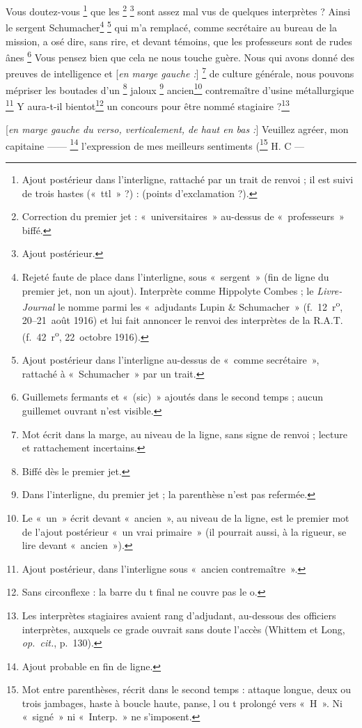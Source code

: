 \begin{LJlettre}
Vous doutez-vous \footnote{Ajout postérieur dans l'interligne, rattaché par un trait de renvoi ; il est suivi de trois hastes («~ttl~» ?) : \LJill{} (points d'exclamation ?).} que les  \footnote{Correction du premier jet : «~universitaires~» au-dessus de «~professeurs~» biffé.} \footnote{Ajout postérieur.} sont assez mal vus de quelques interprètes ? Ainsi le sergent Schumacher\footnote{Rejeté faute de place dans l'interligne, sous «~sergent~» (fin de ligne du premier jet, non un ajout). Interprète comme Hippolyte Combes ; le \textit{Livre-Journal} le nomme parmi les «~adjudants Lupin \& Schumacher~» (f.~12~r\textsuperscript{o}, 20--21~août 1916) et lui fait annoncer le renvoi des interprètes de la R.A.T. (f.~42~r\textsuperscript{o}, 22~octobre 1916).} \footnote{Ajout postérieur dans l'interligne au-dessus de «~comme secrétaire~», rattaché à «~Schumacher~» par un trait.} qui m'a remplacé, comme secrétaire au bureau de la mission, a osé dire, sans rire, et devant témoins, que les professeurs sont de rudes ânes \footnote{Guillemets fermants et «~(sic)~» ajoutés dans le second temps ; aucun guillemet ouvrant n'est visible.} Vous pensez bien que cela ne nous touche guère. Nous qui avons donné des preuves de  intelligence et [\textit{en marge gauche :}] \footnote{Mot écrit dans la marge, au niveau de la ligne, sans signe de renvoi ; lecture et rattachement incertains.} de  culture générale, nous pouvons mépriser les boutades d'un \footnote{Biffé dès le premier jet.} jaloux \footnote{Dans l'interligne, du premier jet ; la parenthèse n'est pas refermée.} ancien\footnote{Le «~un~» écrit devant «~ancien~», au niveau de la ligne, est le premier mot de l'ajout postérieur «~un vrai primaire~» (il pourrait aussi, à la rigueur, se lire devant «~ancien~»).} contremaître d'usine métallurgique \footnote{Ajout postérieur, dans l'interligne sous «~ancien contremaître~».} Y aura-t-il bientot\footnote{Sans circonflexe : la barre du t final ne couvre pas le o.} un concours pour être nommé stagiaire ?\footnote{Les interprètes stagiaires avaient rang d'adjudant, au-dessous des officiers interprètes, auxquels ce grade ouvrait sans doute l'accès (Whittem et Long, \textit{op.~cit.}, p.~130).}

[\textit{en marge gauche du verso, verticalement, de haut en bas :}] Veuillez agréer, mon capitaine —— \footnote{Ajout probable en fin de ligne.} l'expression de mes meilleurs sentiments (\LJill{}\footnote{Mot entre parenthèses, récrit dans le second temps : attaque longue, deux ou trois jambages, haste à boucle haute, panse, l ou t prolongé vers «~H~». Ni «~signé~» ni «~Interp.~» ne s'imposent.} H. C —
\end{LJlettre}


